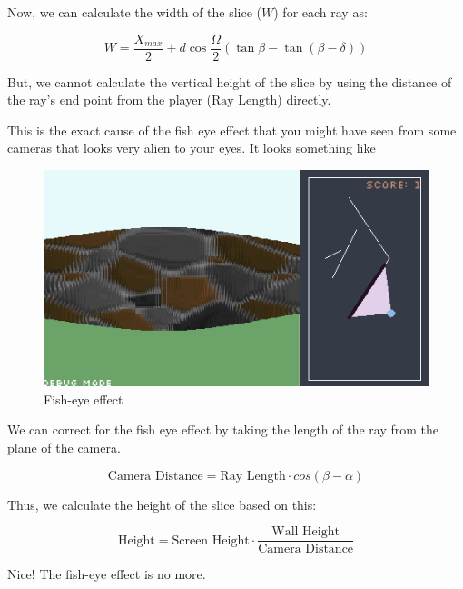Now, we can calculate the width of the slice ($W$) for each ray as:

\begin{equation}
    W = \frac{X_{max}}{2} + d \cos\frac{\Omega}{2} (\tan\beta - \tan(\beta - \delta))
\end{equation}

But, we cannot calculate the vertical height of the slice by using the distance of the ray's end point from the player ($\text{Ray Length}$) directly.

This is the exact cause of the fish eye effect that you might have seen from some cameras that looks very alien to your eyes. It looks something like

\begin{figure}[!ht]
    \centering
    \includegraphics[width=\textwidth]{./images/fish eye.png}
    \caption{Fish-eye effect}
    \label{fig:fish-eye}
\end{figure}

We can correct for the fish eye effect by taking the length of the ray from the plane of the camera.

\begin{equation}
    \text{Camera Distance} = \text{Ray Length} \cdot  cos(\beta - \alpha)
\end{equation}

Thus, we calculate the height of the slice based on this:

\begin{equation}
    \text{Height} = \text{Screen Height} \cdot \frac{ \text{Wall Height}}{\text{Camera Distance}}
\end{equation}

Nice! The fish-eye effect is no more.


